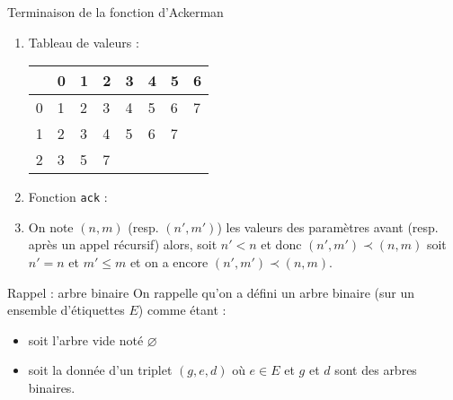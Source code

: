 \documentclass[10pt]{beamer}
\begin{document}
\begin{frame}[fragile]{\Ctitle}{\stitle}
	\begin{exampleblock}{Terminaison de la fonction d'Ackerman}
		\begin{enumerate}
			\item<2-> Tableau de valeurs :\\
				\begin{tabular}{|l|l|l|l|l|l|l|l|}
					\hline
					\backslashbox{$n$}{$m$}  & 0 & 1 & 2 & 3                    & 4 & 5 & 6                    \\
					\hline
					0 & 1 & 2 & 3 & 4                    & 5 & 6 & 7                    \\
					\hline
					1 & 2 & 3 & 4 & 5                    & 6 & 7 & \multicolumn{1}{c}{} \\
					\cline{1-7}
					2 & 3 & 5 & 7 & \multicolumn{4}{c}{}                                \\
					\cline{1-4}
				\end{tabular}
			\item<3-> Fonction {\tt ack} :
			\item<4-> On note $(n,m)$ (resp. $(n',m')$) les valeurs des paramètres avant (resp. après un appel récursif) alors, soit $n' <n$ et donc $(n',m') \prec (n,m)$ soit $n'=n$ et $m' \leq m$ et on a encore $(n',m') \prec (n,m)$.
		\end{enumerate}
	\end{exampleblock}
\end{frame}

\begin{frame}[fragile]{\Ctitle}{\stitle}
	\begin{block}{Rappel : arbre binaire}
		On rappelle qu'on a défini un arbre binaire (sur un ensemble d'étiquettes $E$) comme étant :
		\begin{itemize}
			\item soit l'arbre vide noté $\varnothing$
			\item soit la donnée d'un triplet $(g, e, d)$ où $e \in E$ et $g$ et $d$ sont des arbres binaires.
		\end{itemize}
	\end{block}
\end{frame}
\end{document}
